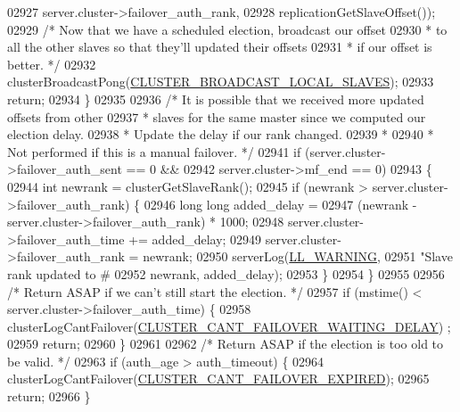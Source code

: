 \begin{DoxyCode}
{{{{{{{{{{{{{{{{{{{{{{{{{{{{{{{{{{{{{{{{{{{{{{{{{{{{{02927             server.cluster->failover\_auth\_rank,
02928             replicationGetSlaveOffset());
02929         \textcolor{comment}{/* Now that we have a scheduled election, broadcast our offset}
02930 \textcolor{comment}{         * to all the other slaves so that they'll updated their offsets}
02931 \textcolor{comment}{         * if our offset is better. */}
02932         clusterBroadcastPong(\hyperlink{cluster_8c_a49481f5cedbd75ce025011b331021822}{CLUSTER\_BROADCAST\_LOCAL\_SLAVES});
02933         \textcolor{keywordflow}{return};
02934     \}
02935 
02936     \textcolor{comment}{/* It is possible that we received more updated offsets from other}
02937 \textcolor{comment}{     * slaves for the same master since we computed our election delay.}
02938 \textcolor{comment}{     * Update the delay if our rank changed.}
02939 \textcolor{comment}{     *}
02940 \textcolor{comment}{     * Not performed if this is a manual failover. */}
02941     \textcolor{keywordflow}{if} (server.cluster->failover\_auth\_sent == 0 &&
02942         server.cluster->mf\_end == 0)
02943     \{
02944         \textcolor{keywordtype}{int} newrank = clusterGetSlaveRank();
02945         \textcolor{keywordflow}{if} (newrank > server.cluster->failover\_auth\_rank) \{
02946             \textcolor{keywordtype}{long} \textcolor{keywordtype}{long} added\_delay =
02947                 (newrank - server.cluster->failover\_auth\_rank) * 1000;
02948             server.cluster->failover\_auth\_time += added\_delay;
02949             server.cluster->failover\_auth\_rank = newrank;
02950             serverLog(\hyperlink{server_8h_a31229b9334bba7d6be2a72970967a14b}{LL\_WARNING},
02951                 \textcolor{stringliteral}{"Slave rank updated to #%
02952                 newrank, added\_delay);
02953         \}
02954     \}
02955 
02956     \textcolor{comment}{/* Return ASAP if we can't still start the election. */}
02957     \textcolor{keywordflow}{if} (mstime() < server.cluster->failover\_auth\_time) \{
02958         clusterLogCantFailover(\hyperlink{cluster_8h_a40e58ef928e66a27912835d7e6a1c97a}{CLUSTER\_CANT\_FAILOVER\_WAITING\_DELAY})
      ;
02959         \textcolor{keywordflow}{return};
02960     \}
02961 
02962     \textcolor{comment}{/* Return ASAP if the election is too old to be valid. */}
02963     \textcolor{keywordflow}{if} (auth\_age > auth\_timeout) \{
02964         clusterLogCantFailover(\hyperlink{cluster_8h_af0085657cacf54e82c477680571f7509}{CLUSTER\_CANT\_FAILOVER\_EXPIRED});
02965         \textcolor{keywordflow}{return};
02966     \}
}}}}}}}}}}}}}}}}}}}}}}}}}}}}}}}}}}}}}}}}}}}}}}}}}}}}}}
\end{DoxyCode}
